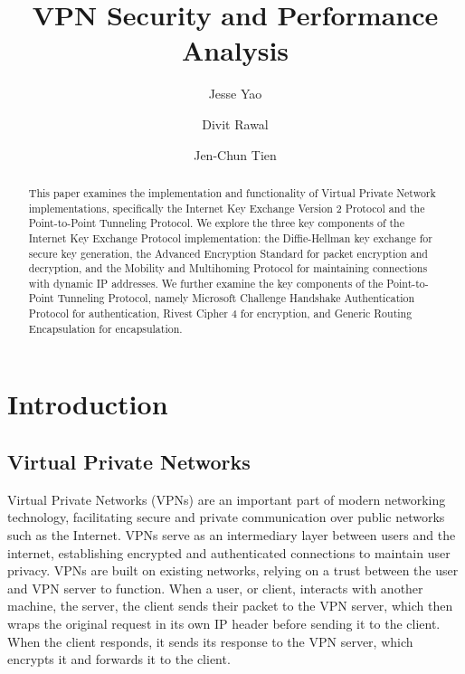 \documentclass[runningheads]{llncs}
\begin{document}
\title{VPN Security and Performance Analysis}

\author{Jesse Yao \and Divit Rawal \and Jen-Chun Tien}


\maketitle

\begin{abstract}
This paper examines the implementation and functionality of Virtual Private Network implementations, specifically the Internet Key Exchange Version 2 Protocol and the Point-to-Point Tunneling Protocol. We explore the three key components of the Internet Key Exchange Protocol implementation: the Diffie-Hellman key exchange for secure key generation, the Advanced Encryption Standard for packet encryption and decryption, and the Mobility and Multihoming Protocol for maintaining connections with dynamic IP addresses. We further examine the key components of the Point-to-Point Tunneling Protocol, namely Microsoft Challenge Handshake Authentication Protocol for authentication, Rivest Cipher 4 for encryption, and Generic Routing Encapsulation for encapsulation.
\end{abstract}

\section{Introduction}
\subsection{Virtual Private Networks}
Virtual Private Networks (VPNs) are an important part of  modern networking technology, facilitating secure and private communication over public networks such as the Internet. VPNs serve as an intermediary layer between users and the internet, establishing encrypted and authenticated connections to maintain user privacy. VPNs are built on existing networks, relying on a trust between the user and VPN server to function. When a user, or client, interacts with another machine, the server, the client sends their packet to the VPN server, which then wraps the original request in its own IP header before sending it to the client. When the client responds, it sends its response to the VPN server, which encrypts it and forwards it to the client.
\end{document}
